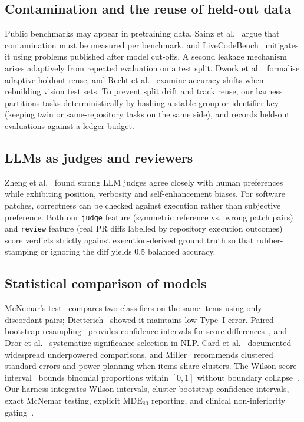 \documentclass[conference]{IEEEtran}
\begin{document}
\subsection{Contamination and the reuse of held-out data}
\label{sec:related-contam}

Public benchmarks may appear in pretraining data. Sainz et al.~\cite{sainz2023contamination} argue that contamination must be measured per benchmark, and LiveCodeBench~\cite{jain2025livecodebench} mitigates it using problems published after model cut-offs. A second leakage mechanism arises adaptively from repeated evaluation on a test split. Dwork et al.~\cite{dwork2015reusable} formalise adaptive holdout reuse, and Recht et al.~\cite{recht2019imagenet} examine accuracy shifts when rebuilding vision test sets. To prevent split drift and track reuse, our harness partitions tasks deterministically by hashing a stable group or identifier key (keeping twin or same-repository tasks on the same side), and records held-out evaluations against a ledger budget.

\subsection{LLMs as judges and reviewers}
\label{sec:related-judges}

Zheng et al.~\cite{zheng2023judge} found strong LLM judges agree closely with human preferences while exhibiting position, verbosity and self-enhancement biases. For software patches, correctness can be checked against execution rather than subjective preference. Both our \texttt{judge} feature (symmetric reference vs.\ wrong patch pairs) and \texttt{review} feature (real PR diffs labelled by repository execution outcomes) score verdicts strictly against execution-derived ground truth so that rubber-stamping or ignoring the diff yields 0.5 balanced accuracy.

\subsection{Statistical comparison of models}
\label{sec:related-stats}

McNemar's test~\cite{mcnemar1947} compares two classifiers on the same items using only discordant pairs; Dietterich~\cite{dietterich1998} showed it maintains low Type~I error. Paired bootstrap resampling~\cite{efron1979bootstrap} provides confidence intervals for score differences~\cite{koehn2004significance}, and Dror et al.~\cite{dror2018hitchhiker} systematize significance selection in NLP. Card et al.~\cite{card2020power} documented widespread underpowered comparisons, and Miller~\cite{miller2024} recommends clustered standard errors and power planning when items share clusters. The Wilson score interval~\cite{wilson1927} bounds binomial proportions within $[0, 1]$ without boundary collapse~\cite{agresti1998}. Our harness integrates Wilson intervals, cluster bootstrap confidence intervals, exact McNemar testing, explicit $\mathrm{MDE}_{80}$ reporting, and clinical non-inferiority gating~\cite{walker2011}.
\end{document}
